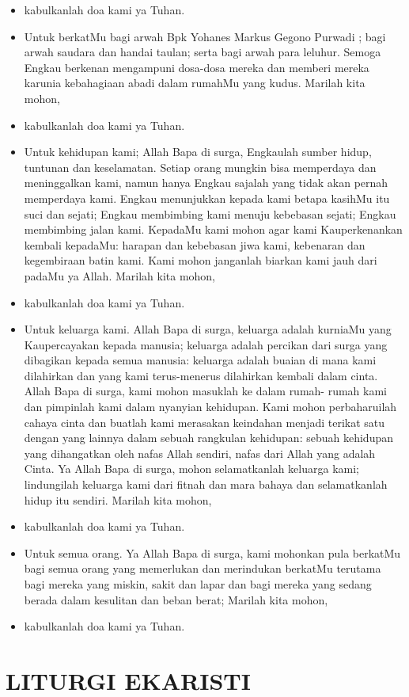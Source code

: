 \documentclass[a5paper,titlepage,10pt,openany]{scrbook}
\newcommand{\BU}[1]{\begin{itemize} \item[U:] #1 \end{itemize}}
\newcommand{\BP}[1]{\begin{itemize} \item[P:] #1 \end{itemize}}
\newcommand{\namaalm}{Bpk Yohanes Markus Gegono Purwadi }
\begin{document}
\BU{kabulkanlah doa kami ya Tuhan.} 

\BP{Untuk berkatMu bagi arwah \namaalm; bagi arwah saudara 
dan handai taulan; serta bagi arwah para leluhur. Semoga 
Engkau berkenan mengampuni dosa-dosa mereka dan 
memberi mereka karunia kebahagiaan abadi dalam rumahMu 
yang kudus. Marilah kita mohon,}

\BU{kabulkanlah doa kami ya Tuhan.} 

\BP{Untuk kehidupan kami; Allah Bapa di surga, Engkaulah 
sumber hidup, tuntunan dan keselamatan. Setiap orang 
mungkin bisa memperdaya dan meninggalkan kami, namun 
hanya Engkau sajalah yang tidak akan pernah memperdaya 
kami. Engkau menunjukkan kepada kami betapa kasihMu itu 
suci dan sejati; Engkau membimbing kami menuju kebebasan 
sejati; Engkau membimbing jalan kami. KepadaMu kami 
mohon agar kami Kauperkenankan kembali kepadaMu: 
harapan dan kebebasan jiwa kami, kebenaran dan 
kegembiraan batin kami. Kami mohon janganlah biarkan 
kami jauh dari padaMu ya Allah. Marilah kita mohon,}

\BU{kabulkanlah doa kami ya Tuhan.} 

\BP{Untuk keluarga kami. Allah Bapa di surga, keluarga adalah 
kurniaMu yang Kaupercayakan kepada manusia; keluarga 
adalah percikan dari surga yang dibagikan kepada semua 
manusia: keluarga adalah buaian di mana kami dilahirkan dan 
yang kami terus-menerus dilahirkan kembali dalam cinta. 
Allah Bapa di surga, kami mohon masuklah ke dalam rumah-
rumah kami dan pimpinlah kami dalam nyanyian kehidupan. 
Kami mohon perbaharuilah cahaya cinta dan buatlah kami 
merasakan keindahan menjadi terikat satu dengan yang 
lainnya dalam sebuah rangkulan kehidupan: sebuah 
kehidupan yang dihangatkan oleh nafas Allah sendiri, nafas 
dari Allah yang adalah Cinta. Ya Allah Bapa di surga, mohon 
selamatkanlah keluarga kami; lindungilah keluarga kami dari 
fitnah dan mara bahaya dan selamatkanlah hidup itu sendiri. 
Marilah kita mohon,}

\BU{kabulkanlah doa kami ya Tuhan.} 

\BP{Untuk semua orang. Ya Allah Bapa di surga, kami mohonkan 
pula berkatMu bagi semua orang yang memerlukan dan 
merindukan berkatMu terutama bagi mereka yang miskin, 
sakit dan lapar dan bagi mereka yang sedang berada dalam 
kesulitan dan beban berat; Marilah kita mohon,}

\BU{kabulkanlah doa kami ya Tuhan.} 

\section*{LITURGI EKARISTI}
\end{document}

